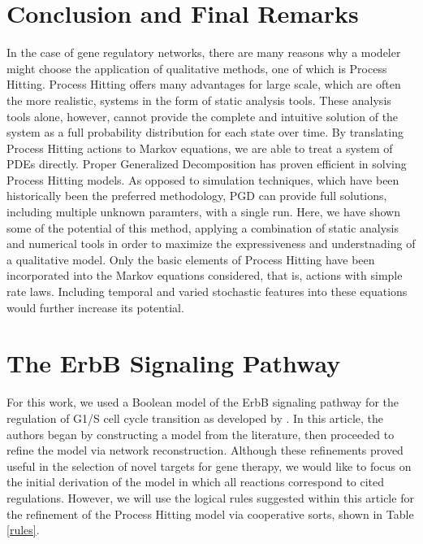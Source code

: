\documentclass{article}
\begin{document}
\section{Conclusion and Final Remarks}
In the case of gene regulatory networks, there are many reasons why a modeler might choose the application of qualitative methods, one of which is Process Hitting. Process Hitting offers many advantages for large scale, which are often the more realistic, systems in the form of static analysis tools. These analysis tools alone, however, cannot provide the complete and intuitive solution of the system as a full probability distribution for each state over time. By translating Process Hitting actions to Markov equations, we are able to treat a system of PDEs directly. Proper Generalized Decomposition has proven efficient in solving Process Hitting models. As opposed to simulation techniques, which have been historically been the preferred methodology, PGD can provide full solutions, including multiple unknown paramters, with a single run. Here, we have shown some of the potential of this method, applying a combination of static analysis and numerical tools in order to maximize the expressiveness and understnading of a qualitative model. Only the basic elements of Process Hitting have been incorporated into the Markov equations considered, that is, actions with simple rate laws. Including temporal and varied stochastic features into these equations would further increase its potential.



\appendix
\section{The ErbB Signaling Pathway}
For this work, we used a Boolean model of the ErbB signaling pathway for the regulation of G1/S cell cycle transition as developed by \cite{Sahin09}. In this article, the authors began by constructing a model from the literature, then proceeded to refine the model via network reconstruction. Although these refinements proved useful in the selection of novel targets for gene therapy, we would like to focus on the initial derivation of the model in which all reactions correspond to cited regulations. However, we will use the logical rules suggested within this article for the refinement of the Process Hitting model via cooperative sorts, shown in Table \ref{rules}.\\
\end{document}

